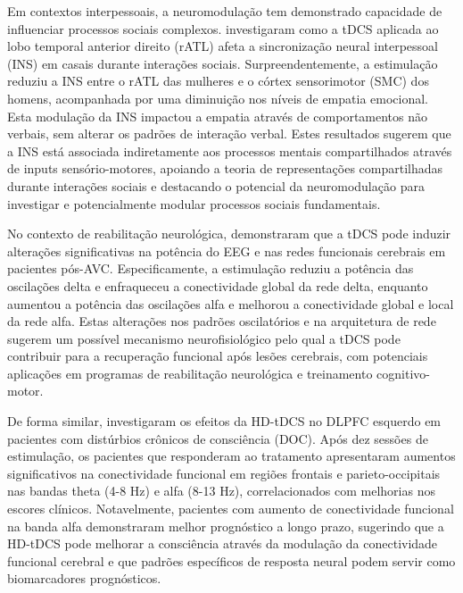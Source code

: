 Em contextos interpessoais, a neuromodulação tem demonstrado capacidade de influenciar processos sociais complexos.  investigaram como a tDCS aplicada ao lobo temporal anterior direito (rATL) afeta a sincronização neural interpessoal (INS) em casais durante interações sociais. Surpreendentemente, a estimulação reduziu a INS entre o rATL das mulheres e o córtex sensorimotor (SMC) dos homens, acompanhada por uma diminuição nos níveis de empatia emocional. Esta modulação da INS impactou a empatia através de comportamentos não verbais, sem alterar os padrões de interação verbal. Estes resultados sugerem que a INS está associada indiretamente aos processos mentais compartilhados através de inputs sensório-motores, apoiando a teoria de representações compartilhadas durante interações sociais e destacando o potencial da neuromodulação para investigar e potencialmente modular processos sociais fundamentais.

No contexto de reabilitação neurológica,  demonstraram que a tDCS pode induzir alterações significativas na potência do EEG e nas redes funcionais cerebrais em pacientes pós-AVC. Especificamente, a estimulação reduziu a potência das oscilações delta e enfraqueceu a conectividade global da rede delta, enquanto aumentou a potência das oscilações alfa e melhorou a conectividade global e local da rede alfa. Estas alterações nos padrões oscilatórios e na arquitetura de rede sugerem um possível mecanismo neurofisiológico pelo qual a tDCS pode contribuir para a recuperação funcional após lesões cerebrais, com potenciais aplicações em programas de reabilitação neurológica e treinamento cognitivo-motor.

De forma similar,  investigaram os efeitos da HD-tDCS no DLPFC esquerdo em pacientes com distúrbios crônicos de consciência (DOC). Após dez sessões de estimulação, os pacientes que responderam ao tratamento apresentaram aumentos significativos na conectividade funcional em regiões frontais e parieto-occipitais nas bandas theta (4-8 Hz) e alfa (8-13 Hz), correlacionados com melhorias nos escores clínicos. Notavelmente, pacientes com aumento de conectividade funcional na banda alfa demonstraram melhor prognóstico a longo prazo, sugerindo que a HD-tDCS pode melhorar a consciência através da modulação da conectividade funcional cerebral e que padrões específicos de resposta neural podem servir como biomarcadores prognósticos.

